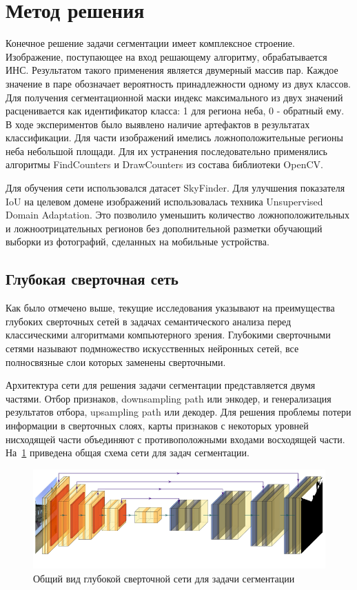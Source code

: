 \section{Метод решения}

Конечное решение задачи сегментации имеет комплексное строение.
Изображение, поступающее на вход решающему алгоритму, обрабатывается ИНС.
Результатом такого применения является двумерный массив пар.
Каждое значение в паре обозначает вероятность принадлежности одному из двух классов.
Для получения сегментационной маски индекс максимального из двух значений расценивается как идентификатор класса: 1 для региона неба, 0 - обратный ему.
В ходе экспериментов было выявлено наличие артефактов в результатах классификации.
Для части изображений имелись ложноположительные регионы неба небольшой площади.
Для их устранения последовательно применялись алгоритмы FindCounters и DrawCounters из состава библиотеки OpenCV.

Для обучения сети использовался датасет SkyFinder.
Для улучшения показателя IoU на целевом домене изображений использовалась техника Unsupervised Domain Adaptation.
Это позволило уменьшить количество ложноположительных и ложноотрицательных регионов без дополнительной разметки обучающий выборки из фотографий,
сделанных на мобильные устройства.

\subsection{Глубокая сверточная сеть}

Как было отмечено выше, текущие исследования указывают на преимущества глубоких сверточных сетей в задачах семантического анализа
перед классическими алгоритмами компьютерного зрения.
Глубокими сверточными сетями называют подмножество искусственных нейронных сетей, все полносвязные слои которых заменены сверточными.

Архитектура сети для решения задачи сегментации представляется двумя частями.
Отбор признаков, downsampling path или энкодер, и генерализация результатов отбора, upsampling path или декодер.
Для решения проблемы потери информации в сверточных слоях, карты признаков с некоторых уровней нисходящей части объединяют с противоположными входами восходящей части.
На~\ref{fig:net_arch_common} приведена общая схема сети для задач сегментации.

\begin{figure}[H]
    \centering
    \includegraphics[width=\textwidth]{img/net_arch.png}
    \caption{Общий вид глубокой сверточной сети для задачи сегментации}
    \label{fig:net_arch_common}
\end{figure}

